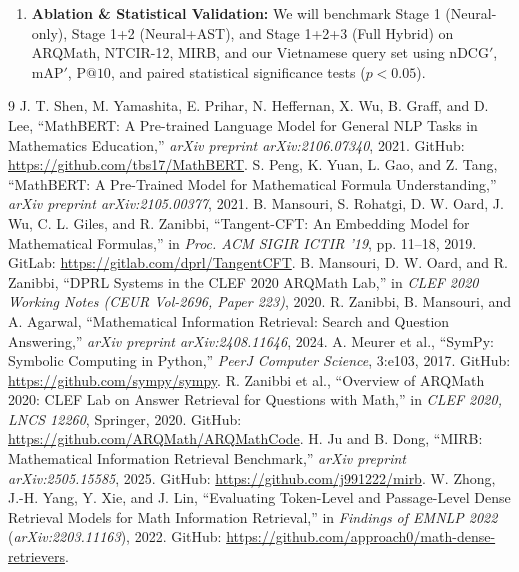\documentclass[11pt,a4paper]{article}
\begin{document}
\begin{enumerate}
\begin{itemize}
		\end{itemize}
		\item \textbf{Ablation \& Statistical Validation:} We will benchmark Stage 1 (Neural-only), Stage 1+2 (Neural+AST), and Stage 1+2+3 (Full Hybrid) on ARQMath, NTCIR-12, MIRB, and our Vietnamese query set using $\text{nDCG}'$, $\text{mAP}'$, $\text{P}@10$, and paired statistical significance tests ($p < 0.05$).
	\end{enumerate}

	\begin{thebibliography}{9}
		 J. T. Shen, M. Yamashita, E. Prihar, N. Heffernan, X. Wu, B. Graff, and D. Lee, ``MathBERT: A Pre-trained Language Model for General NLP Tasks in Mathematics Education,'' \textit{arXiv preprint arXiv:2106.07340}, 2021. GitHub: \url{https://github.com/tbs17/MathBERT}.
		 S. Peng, K. Yuan, L. Gao, and Z. Tang, ``MathBERT: A Pre-Trained Model for Mathematical Formula Understanding,'' \textit{arXiv preprint arXiv:2105.00377}, 2021.
		 B. Mansouri, S. Rohatgi, D. W. Oard, J. Wu, C. L. Giles, and R. Zanibbi, ``Tangent-CFT: An Embedding Model for Mathematical Formulas,'' in \textit{Proc. ACM SIGIR ICTIR '19}, pp. 11--18, 2019. GitLab: \url{https://gitlab.com/dprl/TangentCFT}.
		 B. Mansouri, D. W. Oard, and R. Zanibbi, ``DPRL Systems in the CLEF 2020 ARQMath Lab,'' in \textit{CLEF 2020 Working Notes (CEUR Vol-2696, Paper 223)}, 2020.
		 R. Zanibbi, B. Mansouri, and A. Agarwal, ``Mathematical Information Retrieval: Search and Question Answering,'' \textit{arXiv preprint arXiv:2408.11646}, 2024.
		 A. Meurer et al., ``SymPy: Symbolic Computing in Python,'' \textit{PeerJ Computer Science}, 3:e103, 2017. GitHub: \url{https://github.com/sympy/sympy}.
		 R. Zanibbi et al., ``Overview of ARQMath 2020: CLEF Lab on Answer Retrieval for Questions with Math,'' in \textit{CLEF 2020, LNCS 12260}, Springer, 2020. GitHub: \url{https://github.com/ARQMath/ARQMathCode}.
		 H. Ju and B. Dong, ``MIRB: Mathematical Information Retrieval Benchmark,'' \textit{arXiv preprint arXiv:2505.15585}, 2025. GitHub: \url{https://github.com/j991222/mirb}.
		 W. Zhong, J.-H. Yang, Y. Xie, and J. Lin, ``Evaluating Token-Level and Passage-Level Dense Retrieval Models for Math Information Retrieval,'' in \textit{Findings of EMNLP 2022} (\textit{arXiv:2203.11163}), 2022. GitHub: \url{https://github.com/approach0/math-dense-retrievers}.
	\end{thebibliography}
\end{document}
